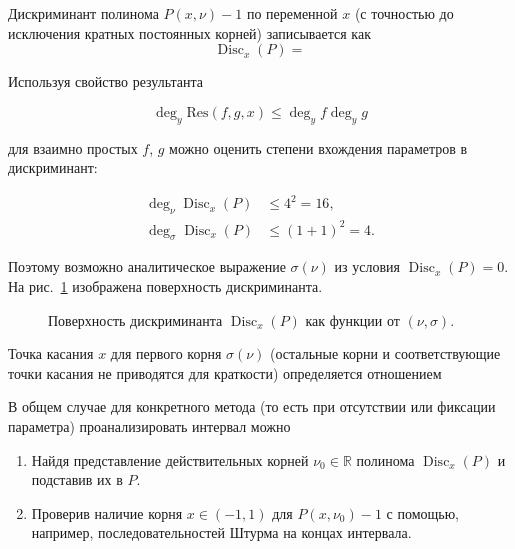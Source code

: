 \documentclass[14pt]{report}
\begin{document}
Дискриминант полинома $P(x,\nu)-1$ по переменной $x$ (с точностью до исключения кратных постоянных корней) записывается как
\begin{dmath}
\operatorname{Disc}_x(P) = 
\label{eq:discriminant}
\end{dmath}


Используя свойство результанта

\[
\deg_y\mathrm{Res}(f,g,x) \leq \deg_y{f}\deg_y{g}
\]

для взаимно простых $f$, $g$ можно оценить степени вхождения параметров в дискриминант:

\begin{align}
\deg_{\nu} \operatorname{Disc}_x(P) & \le 4^2 = 16,\\[1em]
\deg_{\sigma} \operatorname{Disc}_x(P) & \le (1 + 1)^2 = 4.
\end{align}

Поэтому возможно аналитическое выражение $\sigma(\nu)$ из условия $\operatorname{Disc}_x(P)=0$. На рис.~\ref{fig:discriminant-surface} изображена поверхность дискриминанта.

\begin{figure}[hb]
\centering
\scalebox{.6}{}
\caption{Поверхность дискриминанта $\operatorname{Disc}_x(P)$ как функции от $(\nu,\sigma)$.}
\label{fig:discriminant-surface}
\end{figure}

Точка касания $x$ для первого корня $\sigma(\nu)$ (остальные корни и соответствующие точки касания не приводятся для краткости) определяется отношением



В общем случае для конкретного метода (то есть при отсутствии или фиксации параметра) проанализировать интервал можно

\vspace{1em}

\begin{enumerate}
\item Найдя представление действительных корней $\nu_0 \in \mathbb{R}$ полинома $\operatorname{Disc}_x(P)$ и подставив их в $P$.

\vspace{0.5em}

\item Проверив наличие корня $x \in (-1, 1)$ для $P(x,\nu_0)-1$ с помощью, например, последовательностей Штурма на концах интервала.
\end{enumerate}
\end{document}
